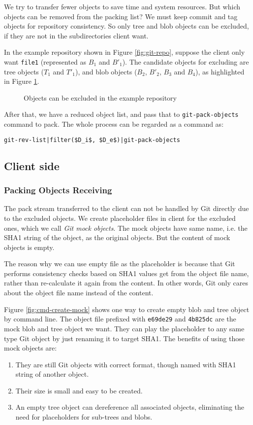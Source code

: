 \documentclass[preprint]{sigplanconf}
\begin{document}
We try to transfer fewer objects to save time and system resources.
But which objects can be removed from the packing list?
We must keep commit and tag objects for repository consistency.
So only tree and blob objects can be excluded, if they are not in the subdirectories client want.

In the example repository shown in Figure \ref{fig:git-repo}, suppose the client only want \verb|file1| (represented as $B_1$ and $B'_1$).
The candidate objects for excluding are tree objects ($T_1$ and $T'_1$), and blob objects ($B_2$, $B'_2$, $B_3$ and $B_4$), as highlighted in Figure \ref{fig:find-obj-to-remove}.
\begin{figure}[htpb]
  \centering
  
  \caption{Objects can be excluded in the example repository}
  \label{fig:find-obj-to-remove}
\end{figure}

After that, we have a reduced object list, and pass that to \verb|git-pack-objects| command to pack.
The whole process can be regarded as a command as:
\begin{verbatim}
git-rev-list|filter($D_i$, $D_e$)|git-pack-objects
\end{verbatim}

\subsection{Client side}
\subsubsection{Packing Objects Receiving}
The pack stream transferred to the client can not be handled by Git directly due to the excluded objects.
We create placeholder files in client for the excluded ones, which we call \emph{Git mock objects}.
The mock objects have same name, i.e. the SHA1 string of the object, as the original objects.
But the content of mock objects is empty.

The reason why we can use empty file as the placeholder is because that Git performs consistency checks based on SHA1 values get from the object file name, rather than re-calculate it again from the content. In other words, Git only cares about the object file name instead of the content.

Figure \ref{fig:cmd-create-mock} shows one way to create empty blob and tree object by command line.
The object file prefixed with \verb|e69de29| and \verb|4b825dc| are the mock blob and tree object we want.
They can play the placeholder to any same type Git object by just renaming it to target SHA1.
The benefits of using those mock objects are:
\begin{enumerate}
  \item They are still Git objects with correct format, though named with SHA1 string of another object.
  \item Their size is small and easy to be created.
  \item An empty tree object can dereference all associated objects, eliminating the need for placeholders for sub-trees and blobs.
\end{enumerate}
\end{document}
